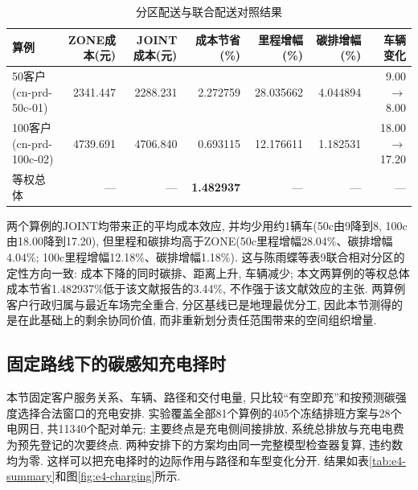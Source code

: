 \documentclass{setp-new}
\newcommand{\setptabsetup}{\fontsize{9pt}{10.5pt}\selectfont\renewcommand{\arraystretch}{0.95}\setlength{\tabcolsep}{2.2pt}\setlength{\aboverulesep}{0.4pt}\setlength{\belowrulesep}{0.4pt}\hbadness=10000}
\begin{document}
\begin{table}[H]
\centering
\caption{分区配送与联合配送对照结果}
\label{tab:e3-summary}
\setptabsetup
\begin{tabular*}{\linewidth}{@{\extracolsep{\fill}}lrrrrrr@{}}
\toprule
算例 & ZONE成本(元) & JOINT成本(元) & 成本节省(\%) & 里程增幅(\%) & 碳排增幅(\%) & 车辆变化\\
\midrule
50客户(cn-prd-50c-01) & 2341.447 & 2288.231 & 2.272759 & 28.035662 & 4.044894 & 9.00$\to$8.00 \\
100客户(cn-prd-100c-02) & 4739.691 & 4706.840 & 0.693115 & 12.176611 & 1.182531 & 18.00$\to$17.20 \\
\midrule
等权总体 & --- & --- & \textbf{1.482937} & --- & --- & ---\\
\bottomrule
\end{tabular*}
\end{table}

两个算例的JOINT均带来正的平均成本效应, 并均少用约1辆车(50c由9降到8, 100c由18.00降到17.20),
但里程和碳排均高于ZONE(50c里程增幅28.04\%、碳排增幅4.04\%; 100c里程增幅12.18\%、碳排增幅1.18\%).
这与陈雨蝶等\cite{ref:48}表9联合相对分区的定性方向一致: 成本下降的同时碳排、距离上升, 车辆减少;
本文两算例的等权总体成本节省1.482937\%低于该文献报告的3.44\%, 不作强于该文献效应的主张.
两算例客户行政归属与最近车场完全重合, 分区基线已是地理最优分工,
因此本节测得的是在此基础上的剩余协同价值, 而非重新划分责任范围带来的空间组织增量.

\subsection{固定路线下的碳感知充电择时}

本节固定客户服务关系、车辆、路径和交付电量,
只比较“有空即充”和按预测碳强度选择合法窗口的充电安排.
实验覆盖全部81个算例的405个冻结排班方案与28个电网日, 共11340个配对单元;
主要终点是充电侧间接排放, 系统总排放与充电电费为预先登记的次要终点.
两种安排下的方案均由同一完整模型检查器复算, 违约数均为零.
这样可以把充电择时的边际作用与路径和车型变化分开.
结果如表\ref{tab:e4-summary}和图\ref{fig:e4-charging}所示.
\end{document}
